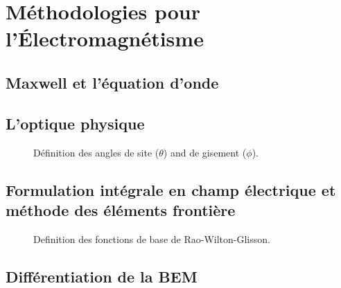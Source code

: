\chapter{Méthodologies pour l'\'Electromagnétisme}
\section{Maxwell et l'équation d'onde}
\lipsum
\section{L'optique physique}
\lipsum

\begin{figure}[htp]
    \centering
    
    \caption{Définition des angles de site ($\theta$) and de gisement ($\phi$).}
    \label{fig:angles-def}
    \hypertarget{def-phi}{}
    \hypertarget{def-theta}{}
\end{figure}

%

\section[Formulation intégrale en champ électrique et méthode des éléments frontière]{Formulation intégrale en champ électrique et méthode des éléments frontière}
\lipsum

%
%
\begin{figure}[htp]
    \centering
    
    \caption{Definition des fonctions de base de Rao-Wilton-Glisson.}
    \label{fig:RWG-def}
\end{figure}

\section{Différentiation de la BEM}
\lipsum